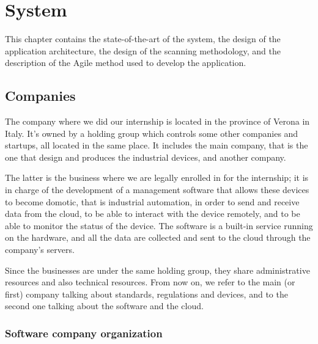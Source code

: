 \chapter{System}

This chapter contains the state-of-the-art of the system, the design of the application architecture, the design of the scanning methodology, and the description of the Agile method used to develop the application.



\section{Companies}

The company where we did our internship is located in the province of Verona in Italy. It's owned by a holding group which controls some other companies and startups, all located in the same place. It includes the main company, that is the one that design and produces the industrial devices, and another company.

The latter is the business where we are legally enrolled in for the internship; it is in charge of the development of a management software that allows these devices to become domotic, that is industrial automation, in order to send and receive data from the cloud, to be able to interact with the device remotely, and to be able to monitor the status of the device. The software is a built-in service running on the hardware, and all the data are collected and sent to the cloud through the company's servers.

Since the businesses are under the same holding group, they share administrative resources and also technical resources. From now on, we refer to the main (or first) company talking about standards, regulations and devices, and to the second one talking about the software and the cloud.

\subsection{Software company organization}

